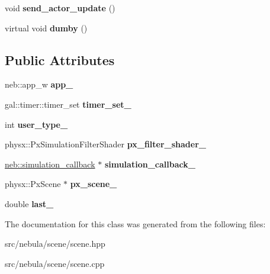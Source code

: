 \begin{DoxyCompactItemize}
\item 
\hypertarget{classneb_1_1scene_1_1scene_abc96c584a43aabbb6e4bc8d66ed35a2a}{
void {\bfseries send\_\-actor\_\-update} ()}
\label{classneb_1_1scene_1_1scene_abc96c584a43aabbb6e4bc8d66ed35a2a}

\item 
\hypertarget{classneb_1_1scene_1_1scene_a037bc8e01e290d9c1fc6959a13343c1e}{
virtual void {\bfseries dumby} ()}
\label{classneb_1_1scene_1_1scene_a037bc8e01e290d9c1fc6959a13343c1e}

\end{DoxyCompactItemize}
\subsection*{Public Attributes}
\begin{DoxyCompactItemize}
\item 
\hypertarget{classneb_1_1scene_1_1scene_a8527e6bb51b445c7dc99efcaaa8198c1}{
neb::app\_\-w {\bfseries app\_\-}}
\label{classneb_1_1scene_1_1scene_a8527e6bb51b445c7dc99efcaaa8198c1}

\item 
\hypertarget{classneb_1_1scene_1_1scene_a99398d74631477541fe414f7455c6560}{
gal::timer::timer\_\-set {\bfseries timer\_\-set\_\-}}
\label{classneb_1_1scene_1_1scene_a99398d74631477541fe414f7455c6560}

\item 
\hypertarget{classneb_1_1scene_1_1scene_a0c7cc06520332f35eaaa43d06f303e17}{
int {\bfseries user\_\-type\_\-}}
\label{classneb_1_1scene_1_1scene_a0c7cc06520332f35eaaa43d06f303e17}

\item 
\hypertarget{classneb_1_1scene_1_1scene_a4080cb2f22531e88d5562834011dd8e0}{
physx::PxSimulationFilterShader {\bfseries px\_\-filter\_\-shader\_\-}}
\label{classneb_1_1scene_1_1scene_a4080cb2f22531e88d5562834011dd8e0}

\item 
\hypertarget{classneb_1_1scene_1_1scene_a65cada9f46dc732db546eff588c9eae8}{
\hyperlink{classneb_1_1simulation__callback}{neb::simulation\_\-callback} $\ast$ {\bfseries simulation\_\-callback\_\-}}
\label{classneb_1_1scene_1_1scene_a65cada9f46dc732db546eff588c9eae8}

\item 
\hypertarget{classneb_1_1scene_1_1scene_a94b89a56deddecfba35b9829f8315ad8}{
physx::PxScene $\ast$ {\bfseries px\_\-scene\_\-}}
\label{classneb_1_1scene_1_1scene_a94b89a56deddecfba35b9829f8315ad8}

\item 
\hypertarget{classneb_1_1scene_1_1scene_a37110b74e5abbe2e88c92815f533a937}{
double {\bfseries last\_\-}}
\label{classneb_1_1scene_1_1scene_a37110b74e5abbe2e88c92815f533a937}

\end{DoxyCompactItemize}


The documentation for this class was generated from the following files:\begin{DoxyCompactItemize}
\item 
src/nebula/scene/scene.hpp\item 
src/nebula/scene/scene.cpp\end{DoxyCompactItemize}
